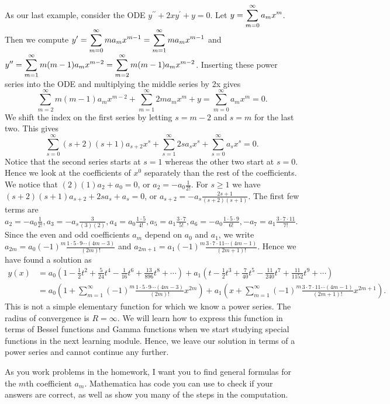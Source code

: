 As our last example, consider the ODE
$y^{\prime\prime}+2xy^\prime+y=0$. Let $\displaystyle y=\sum_{m=0}^\infty a_m x^m$. Then we compute 
$\displaystyle y^\prime 
= \sum_{m=0}^\infty m a_m x^{m-1} 
= \sum_{m=1}^\infty m a_m x^{m-1} 
$ and 
$\displaystyle y^{\prime \prime }
= \sum_{m=1}^\infty m(m-1) a_m x^{m-2} 
= \sum_{m=2}^\infty m(m-1) a_m x^{m-2} 
$.
Inserting these power series into the ODE and multiplying the middle series by 2x gives 
$$\sum_{m=2}^\infty m(m-1) a_m x^{m-2}+\sum_{m=1}^\infty 2m a_m x^{m} +y=\sum_{m=0}^\infty a_m x^m=0.$$ We shift the index on the first series by letting $s=m-2$ and $s=m$ for the last two.  This gives 
$$\sum_{s=0}^\infty (s+2)(s+1) a_{s+2} x^{s}+\sum_{s=1}^\infty 2s a_s x^{s} +\sum_{s=0}^\infty a_s x^s=0.$$ Notice that the second series starts at $s=1$ whereas the other two start at $s=0$.  Hence we look at the coefficients of $x^0$ separately than the rest of the coefficients.  We notice that $(2)(1)a_2 +a_0 = 0$, or $a_2=-a_0\frac{1}{2!}$.  For $s\geq 1$ we have $(s+2)(s+1) a_{s+2}+2s a_s+a_s =0$, or $ a_{s+2} = -a_s\frac{2s+1}{(s+2)(s+1)}$. The first few terms are $a_2=-a_0\frac{1}{2!}, a_3 = -a_s\frac{3}{(3)(2)}, a_4=a_0\frac{1\cdot 5}{4!},a_5=a_1\frac{3\cdot 7}{5!},a_6=-a_0\frac{1\cdot 5\cdot 9}{6!},-a_7=a_1\frac{3\cdot 7\cdot 11}{7!}$. Since the even and odd coefficients $a_m$ depend on $a_0$ and $a_1$, we write $a_{2m}=a_0(-1)^m \frac{1\cdot 5\cdot 9\cdots(4m-3)}{(2m)!}$ and $a_{2m+1}=a_1(-1)^m\frac{3\cdot 7\cdot 11\cdots(4m-1)}{(2m+1)!}$. Hence we have found a solution as 
\begin{align*}
y(x) &= a_0\left(1-{\frac {1}{2}}{t}^{2}+{\frac {5}{24}}{t}^{4}-{
\frac {1}{16}}{t}^{6}+{\frac {13}{896}}{t}^{8}+\cdots
 \right) +a_1\left(t-{\frac {1}{2}}{t}^{3}+{\frac {7}{40}}{t}^{5}-{
\frac {11}{240}}{t}^{7}+{\frac {11}{1152}}{t}^{9} +\cdots\right)\\
&= a_0\left(1+\sum_{m=1}^\infty (-1)^m \frac{1\cdot 5\cdot 9\cdots(4m-3)}{(2m)!}x^{2m} \right) +a_1\left(x+\sum_{m=1}^\infty (-1)^m\frac{3\cdot 7\cdot 11\cdots(4m-1)}{(2m+1)!}x^{2m+1} \right). 
\end{align*}
This is not a simple elementary function for which we know a power series. The radius of convergence is $R=\infty$.  We will learn how to express this function in terms of Bessel functions and Gamma functions when we start studying special functions in the next learning module.  Hence, we leave our solution in terms of a power series and cannot continue any further.

As you work problems in the homework, I want you to find general formulas for the $m$th coefficient $a_m$. Mathematica has code you can use to check if your answers are correct, as well as show you many of the steps in the computation. 

